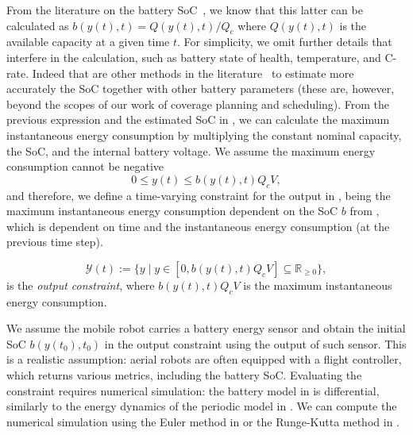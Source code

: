 From the literature on the battery SoC~\citep{sunden2019thermal,kurzweil2018state,kurzweil2021state,deng2017maximum}, we know that this latter can be calculated as $b(y(t),t)=Q(y(t),t)/Q_c$ where $Q(y(t),t)$ is the available capacity at a given time $t$. For simplicity, we omit further details that interfere in the calculation, such as battery state of health, temperature, and C-rate. Indeed that are other methods in the literature~\citep{lu2013review,zhang2018state,espedal2021current} to estimate more accurately the SoC together with other battery parameters (these are, however, beyond the scopes of our work of coverage planning and scheduling). From the previous expression and the estimated SoC in , we can calculate the maximum instantaneous energy consumption by multiplying the constant nominal capacity, the SoC, and the internal battery voltage. We assume the maximum energy consumption cannot be negative
\begin{equation}
  0\leq y(t)\leq b(y(t),t)Q_cV,
\end{equation}
and therefore, we define a time-varying constraint for the output in , being the maximum instantaneous energy consumption dependent on the SoC $b$ from , which is dependent on time and the instantaneous energy consumption (at the previous time step).
\begin{highlight}
\begin{defn}\label{def:const}
\begin{equation*}
  \mathcal{Y}(t):=\{y\mid y\in[0,b(y(t),t)Q_cV]\subseteq{\mathbb{R}_{\geq 0}}\},
\end{equation*}
is the \emph{output constraint}, where $b(y(t),t)Q_cV$ is the maximum instantaneous energy consumption.
\end{defn}
\end{highlight}
We assume the mobile robot carries a battery energy sensor and obtain the initial SoC $b(y(t_0),t_0)$ in the output constraint using the output of such sensor. This is a realistic assumption: aerial robots are often equipped with a flight controller, which returns various metrics, including the battery SoC. Evaluating the constraint requires numerical simulation: the battery model in  is differential, similarly to the energy dynamics of the periodic model in . We can compute the numerical simulation using the Euler method in  or the Runge-Kutta method in . 

